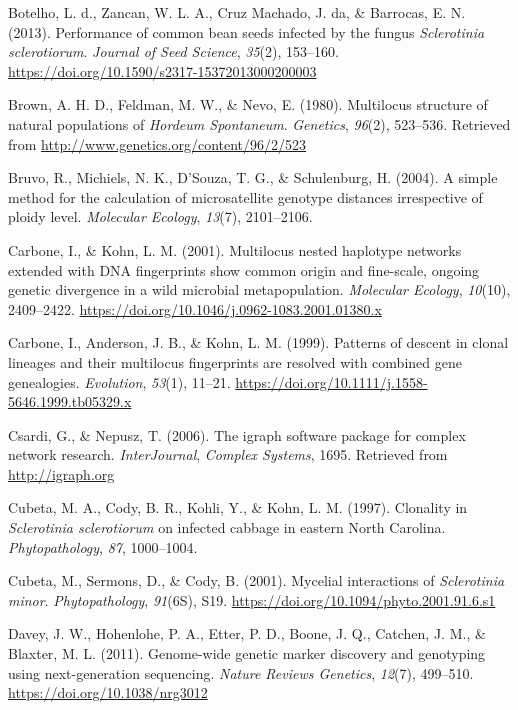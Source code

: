 \documentclass[fleqn,10pt,lineno]{wlpeerj} %
\theoremstyle{definition}
\theoremstyle{definition}
\theoremstyle{definition}
\theoremstyle{remark}
\begin{document}
\hypertarget{ref-botelho2013performance}{}
Botelho, L. d., Zancan, W. L. A., Cruz Machado, J. da, \& Barrocas, E.
N. (2013). Performance of common bean seeds infected by the fungus
\emph{Sclerotinia sclerotiorum}. \emph{Journal of Seed Science},
\emph{35}(2), 153--160.
\url{https://doi.org/10.1590/s2317-15372013000200003}

\hypertarget{ref-brown1980multilocus}{}
Brown, A. H. D., Feldman, M. W., \& Nevo, E. (1980). Multilocus
structure of natural populations of \emph{Hordeum Spontaneum}.
\emph{Genetics}, \emph{96}(2), 523--536. Retrieved from
\url{http://www.genetics.org/content/96/2/523}

\hypertarget{ref-bruvo2004simple}{}
Bruvo, R., Michiels, N. K., D'Souza, T. G., \& Schulenburg, H. (2004). A
simple method for the calculation of microsatellite genotype distances
irrespective of ploidy level. \emph{Molecular Ecology}, \emph{13}(7),
2101--2106.

\hypertarget{ref-carbone2001multilocus}{}
Carbone, I., \& Kohn, L. M. (2001). Multilocus nested haplotype networks
extended with DNA fingerprints show common origin and fine-scale,
ongoing genetic divergence in a wild microbial metapopulation.
\emph{Molecular Ecology}, \emph{10}(10), 2409--2422.
\url{https://doi.org/10.1046/j.0962-1083.2001.01380.x}

\hypertarget{ref-carbone1999patterns}{}
Carbone, I., Anderson, J. B., \& Kohn, L. M. (1999). Patterns of descent
in clonal lineages and their multilocus fingerprints are resolved with
combined gene genealogies. \emph{Evolution}, \emph{53}(1), 11--21.
\url{https://doi.org/10.1111/j.1558-5646.1999.tb05329.x}

\hypertarget{ref-csardi2006igraph}{}
Csardi, G., \& Nepusz, T. (2006). The igraph software package for
complex network research. \emph{InterJournal}, \emph{Complex Systems},
1695. Retrieved from \url{http://igraph.org}

\hypertarget{ref-cubeta1997clonality}{}
Cubeta, M. A., Cody, B. R., Kohli, Y., \& Kohn, L. M. (1997). Clonality
in \emph{Sclerotinia sclerotiorum} on infected cabbage in eastern North
Carolina. \emph{Phytopathology}, \emph{87}, 1000--1004.

\hypertarget{ref-cubeta2001mycelial}{}
Cubeta, M., Sermons, D., \& Cody, B. (2001). Mycelial interactions of
\emph{Sclerotinia minor}. \emph{Phytopathology}, \emph{91}(6S), S19.
\url{https://doi.org/10.1094/phyto.2001.91.6.s1}

\hypertarget{ref-davey2011genome}{}
Davey, J. W., Hohenlohe, P. A., Etter, P. D., Boone, J. Q., Catchen, J.
M., \& Blaxter, M. L. (2011). Genome-wide genetic marker discovery and
genotyping using next-generation sequencing. \emph{Nature Reviews
Genetics}, \emph{12}(7), 499--510. \url{https://doi.org/10.1038/nrg3012}
\end{document}
